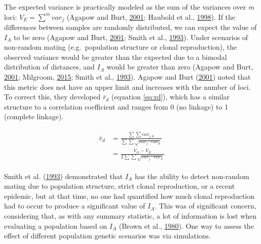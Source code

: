 \documentclass[double,12pt]{beavtex}
\begin{document}
  The expected variance is practically modeled as the sum of the variances
  over \emph{m} loci: \(V_E = \sum^m{var_j}\) (Agapow and Burt,
  \protect\hyperlink{ref-Agapow_2001}{2001}; Haubold et al.,
  \protect\hyperlink{ref-haubold1998detecting}{1998}). If the differences
  between samples are randomly distributed, we can expect the value of
  \(I_A\) to be zero (Agapow and Burt,
  \protect\hyperlink{ref-Agapow_2001}{2001}; Smith et al.,
  \protect\hyperlink{ref-smith1993how}{1993}). Under scenarios of
  non-random mating (e.g.~population structure or clonal reproduction),
  the observed variance would be greater than the expected due to a
  bimodal distribution of distances, and \(I_A\) would be greater than
  zero (Agapow and Burt, \protect\hyperlink{ref-Agapow_2001}{2001};
  Milgroom, \protect\hyperlink{ref-milgroom2015population}{2015}; Smith et
  al., \protect\hyperlink{ref-smith1993how}{1993}). Agapow and Burt
  (\protect\hyperlink{ref-Agapow_2001}{2001}) noted that this metric does
  not have an upper limit and increases with the number of loci. To
  correct this, they developed \(\bar{r}_d\) (equation \eqref{eq:rd}), which
  has a similar structure to a correlation coefficient and ranges from 0
  (no linkage) to 1 (complete linkage).
  
  \begin{align} %
  \begin{split} %
  \bar{r}_d &= \frac{\sum\sum{cov_{j,k}}}{
                     \sum\sum{\sqrt{var_{j} \cdot var_{k}}}} \\
            &= \frac{V_O - V_E}{2\sum\sum{\sqrt{var_{j} \cdot var_{k}}}}
  \end{split}
  \label{eq:rd}
  \end{align}
  
  Smith et al. (\protect\hyperlink{ref-smith1993how}{1993}) demonstrated
  that \(I_A\) has the ability to detect non-random mating due to
  population structure, strict clonal reproduction, or a recent epidemic,
  but at that time, no one had quantified how much clonal reproduction had
  to occur to produce a significant value of \(I_A\). This was of
  significant concern, considering that, as with any summary statistic, a
  lot of information is lost when evaluating a population based on \(I_A\)
  (Brown et al., \protect\hyperlink{ref-brown1980multilocus}{1980}). One
  way to assess the effect of different population genetic scenarios was
  via simulations.
  
\end{document}
